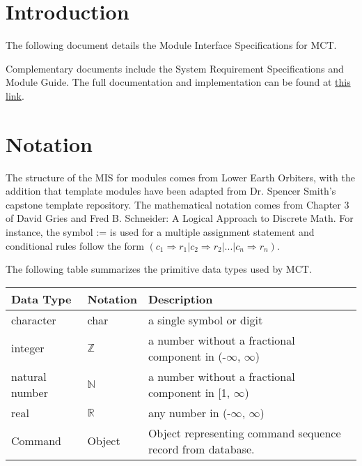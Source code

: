 \documentclass[12pt, titlepage]{article}
\begin{document}
\newpage

\tableofcontents

\newpage


\section{Introduction}

The following document details the Module Interface Specifications for
MCT.

Complementary documents include the System Requirement Specifications
and Module Guide.  The full documentation and implementation can be
found at \href{https://github.com/LowerEarthOrbiters/Lower_Earth_Orbiters}{this link}.

\section{Notation}

The structure of the MIS for modules comes from Lower Earth Orbiters,
with the addition that template modules have been adapted from
Dr. Spencer Smith's capstone template repository.  The mathematical notation comes from Chapter 3 of
 David Gries and Fred B. Schneider: A Logical Approach to Discrete
Math.  For instance, the symbol := is used for a
multiple assignment statement and conditional rules follow the form $(c_1
\Rightarrow r_1 | c_2 \Rightarrow r_2 | ... | c_n \Rightarrow r_n )$.

The following table summarizes the primitive data types used by MCT. 

\begin{center}
\renewcommand{\arraystretch}{1.2}
\noindent 
\begin{tabular}{l l p{7.5cm}} 
\toprule 
\textbf{Data Type} & \textbf{Notation} & \textbf{Description}\\ 
\midrule
character & char & a single symbol or digit\\
integer & $\mathbb{Z}$ & a number without a fractional component in (-$\infty$, $\infty$) \\
natural number & $\mathbb{N}$ & a number without a fractional component in [1, $\infty$) \\
real & $\mathbb{R}$ & any number in (-$\infty$, $\infty$)\\
Command & Object & Object representing command sequence record from database.\\
\bottomrule
\end{tabular} 
\end{center}
\end{document}
